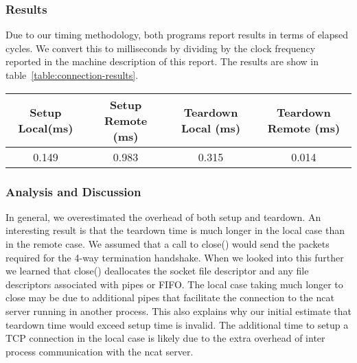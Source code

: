 \subsubsection{Results}
Due to our timing methodology, both programs report results in terms of elapsed cycles. We convert this to milliseconds by dividing by the clock frequency reported in the machine description of this report.
The results are show in table~\ref{table:connection-results}.

\begin{table*}[b]
\begin{tabular}{|c|c|c|c|}
\hline
Setup Local(ms) & Setup Remote (ms) & Teardown Local (ms) & Teardown Remote (ms)\\ \hline
0.149            & 0.983          & 0.315            & 0.014         \\ \hline
\end{tabular}
\caption{Experimental results for TCP connection setup and teardown overhead}
\label{table:connection-results}
\end{table*}

\subsubsection{Analysis and Discussion}
In general, we overestimated the overhead of both setup and teardown. An interesting result is 
that the teardown time is much longer in the local case than in the remote case. We assumed that a 
call to close() would send the packets required for the 4-way termination handshake. When we looked 
into this further we learned that close() deallocates the socket file descriptor and any file 
descriptors associated with pipes or FIFO. The local case taking much longer to close may be due to 
additional pipes that facilitate the connection to the ncat server running in another process.
This also explains why our initial estimate that teardown time would exceed setup time is invalid.
The additional time to setup a TCP connection in the local case is likely due to the extra overhead 
of inter process communication with the ncat server.

